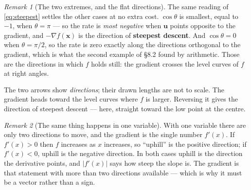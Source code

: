 \documentclass[11pt]{article}
\theoremstyle{plain}
\theoremstyle{definition}
\theoremstyle{remark}
\newtheorem*{rmk}{Remark}
\newcommand{\vc}[1]{\mathbf{#1}}
\newcommand{\grad}{\nabla}
\begin{document}
\begin{rmk}[The two extremes, and the flat directions]
The same reading of \eqref{eq:steepest} settles the other cases at no extra
cost. $\cos\theta$ is smallest, equal to $-1$, when $\theta=\pi$ --- so the rate
is \emph{most negative} when $\vc{u}$ points opposite to the gradient, and
$-\grad f(\vc{x})$ is the direction of \textbf{steepest descent}. And
$\cos\theta=0$ when $\theta=\pi/2$, so the rate is zero exactly along the
directions orthogonal to the gradient, which is what the second example of
\S8.2 found by arithmetic. Those are the directions in which $f$ holds still:
the gradient crosses the level curves of $f$ at right angles.
\end{rmk}

\begin{center}
\end{center}

\noindent The two arrows show \emph{directions}; their drawn lengths are not to
scale. The gradient heads toward the level curves where $f$ is larger. Reversing
it gives the direction of steepest descent --- here, straight toward the low
point at the centre.

\begin{rmk}[The same thing happens in one variable]
With one variable there are only two directions to move, and the gradient is the
single number $f'(x)$. If $f'(x)>0$ then $f$ increases as $x$ increases, so
``uphill'' is the positive direction; if $f'(x)<0$, uphill is the negative
direction. In both cases uphill is the direction the derivative points, and
$\lvert f'(x)\rvert$ says how steep the slope is. The gradient is that statement
with more than two directions available --- which is why it must be a vector
rather than a sign.
\end{rmk}
\end{document}
